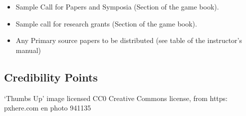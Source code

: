 \begin{refsection}
\begin{itemize}
\item Sample Call for Papers and Symposia (Section  of the game book).

\item Sample call for research grants (Section  of the game book).

\item Any Primary source papers to be distributed (see table  of the instructor's manual)

\end{itemize}

  \pagebreak

\subsection{Credibility Points}
\label{credibilitypoints}

‘Thumbs Up’ image licensed CC0 Creative Commons license, from https:\/ \/ pxhere.com\/ en\/ photo\/ 941135


\end{refsection}
